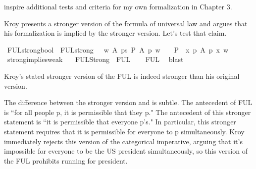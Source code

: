 \begin{isabellebody}
\begin{isamarkuptext}
inspire additional tests and criteria for my own formalization in Chapter 3.%
\end{isamarkuptext}\isamarkuptrue%
%
\begin{isamarkuptext}%
Kroy presents a stronger version of the formula of universal law and argues that his formalization
is implied by the stronger version. Let's test that claim.%
\end{isamarkuptext}\isamarkuptrue%
\isamarkupfalse%
\ FUL{\isacharunderscore}strong{\isacharcolon}{\isacharcolon}bool\ \ {\isachardoublequoteopen}FUL{\isacharunderscore}strong\ {\isasymequiv}\ \ {\isasymforall}w\ A{\isachardot}\ {\isacharparenleft}{\isacharparenleft}{\isasymexists}p{\isacharcolon}{\isacharcolon}s{\isachardot}\ {\isacharparenleft}{\isacharparenleft}P\ {\isacharbraceleft}A\ p{\isacharbraceright}{\isacharparenright}\ w{\isacharparenright}{\isacharparenright}\ \ {\isasymlongrightarrow}{\isacharparenleft}\ {\isacharparenleft}{\isacharparenleft}\ P\ {\isacharbraceleft}\ {\isasymlambda}x{\isachardot}\ {\isasymforall}p{\isachardot}\ A\ p\ x{\isacharbraceright}{\isacharparenright}\ w{\isacharparenright}{\isacharparenright}{\isacharparenright}{\isachardoublequoteclose}\isanewline
\isanewline
{}\isamarkupfalse%
\ strong{\isacharunderscore}implies{\isacharunderscore}weak{\isacharcolon}\isanewline
\ \ \ {\isachardoublequoteopen}FUL{\isacharunderscore}Strong\ {\isasymlongrightarrow}\ FUL{\isachardoublequoteclose}\isanewline
%
\isadelimproof
\ \ %
\endisadelimproof
%
\isatagproof
{}\isamarkupfalse%
\ FUL\ \isamarkupfalse%
\ blast%
\endisatagproof
{\isafoldproof}%
%
\isadelimproof
%
\endisadelimproof
%
\begin{isamarkuptext}%
Kroy's stated stronger version of the FUL is indeed stronger than his original version.%
\end{isamarkuptext}\isamarkuptrue%
%
\begin{isamarkuptext}%
The difference between the stronger version and  is subtle. The antecedent of FUL is ``for all people p,
it is permissible that they p." The antecedent of this stronger statement is ``it is permissible that 
everyone p's." In particular, this stronger statement requires that it is permissible for everyone to
 p simultaneously. Kroy immediately rejects this version of the categorical imperative, arguing that 
it's impossible for everyone to be the US president simultaneously, so this version of the FUL prohibits
running for president.


\end{isamarkuptext}
\end{isabellebody}
